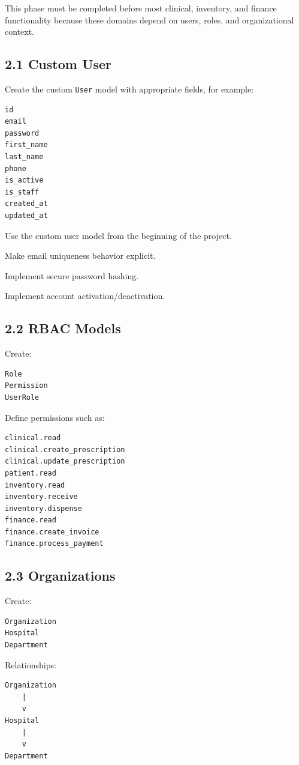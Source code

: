 \documentclass[11pt,a4paper]{article}
\newcommand{\task}[1]{\item[$\square$] #1}
\begin{document}
This phase must be completed before most clinical, inventory, and finance
functionality because these domains depend on users, roles, and
organizational context.

\subsection{2.1 Custom User}

Create the custom \texttt{User} model with appropriate fields, for example:

\begin{lstlisting}
id
email
password
first_name
last_name
phone
is_active
is_staff
created_at
updated_at
\end{lstlisting}

\task{Use the custom user model from the beginning of the project.}
\task{Make email uniqueness behavior explicit.}
\task{Implement secure password hashing.}
\task{Implement account activation/deactivation.}

\subsection{2.2 RBAC Models}

Create:

\begin{lstlisting}
Role
Permission
UserRole
\end{lstlisting}

Define permissions such as:

\begin{lstlisting}
clinical.read
clinical.create_prescription
clinical.update_prescription
patient.read
inventory.read
inventory.receive
inventory.dispense
finance.read
finance.create_invoice
finance.process_payment
\end{lstlisting}

\subsection{2.3 Organizations}

Create:

\begin{lstlisting}
Organization
Hospital
Department
\end{lstlisting}

Relationships:

\begin{lstlisting}
Organization
    |
    v
Hospital
    |
    v
Department
\end{lstlisting}
\end{document}
